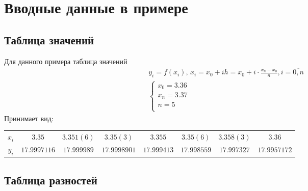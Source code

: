 
\section{Вводные данные в примере}
\subsection{Таблица значений}
Для данного примера таблица значений
\begin{align}
	 & y_i = f(x_i),\, x_i = x_0 + i h = x_0 + i \cdot \frac{x_n - x_0}{n},  i = \overline{0,n} \\
	 & \begin{cases}
		   x_0 = 3.36 \\
		   x_n = 3.37 \\
		   n = 5      \\
	   \end{cases}
\end{align}
Принимает вид:

{
\small
\begin{tabular}{|c|c|c|c|c|c|c|c|}
	\hline
	\(x_i\) & $ 3.35       $ & $ 3.351(6)  $ & $ 3.35(3)    $ & $ 3.355     $ & $ 3.35(6)   $ & $ 3.358(3)  $ & $ 3.36      $ \\
	\(y_i\) & $ 17.9997116 $ & $ 17.999989 $ & $ 17.9998901 $ & $ 17.999413 $ & $ 17.998559 $ & $ 17.997327 $ & $ 17.9957172$ \\
	\hline
\end{tabular}
}

\subsection{Таблица разностей}

